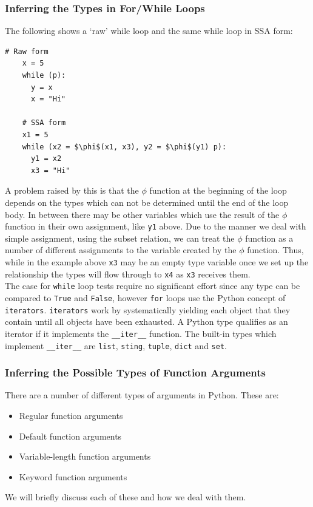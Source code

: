 \documentclass[12pt, titlepage]{article}
\begin{document}
\subsubsection{Inferring the Types in For/While Loops}
The following shows a `raw' while loop and the same while loop in SSA form:
\begin{lstlisting}[mathescape]
    # Raw form
    x = 5
    while (p):
      y = x
      x = "Hi"
	
    # SSA form
    x1 = 5
    while (x2 = $\phi$(x1, x3), y2 = $\phi$(y1) p):
      y1 = x2
      x3 = "Hi"
\end{lstlisting}
A problem raised by this is that the $\phi$ function at the beginning of the loop depends on the types which can not be determined until the end of the loop body. In between there may be other variables which use the result of the $\phi$ function in their own assignment, like \texttt{y1} above. Due to the manner we deal with simple assignment, using the subset relation, we can treat the $\phi$ function as a number of different assignments to the variable created by the $\phi$ function. Thus, while in the example above \texttt{x3} may be an empty type variable once we set up the relationship the types will flow through to \texttt{x4} as \texttt{x3} receives them. \\
\indent The case for \texttt{while} loop tests require no significant effort since any type can be compared to \texttt{True} and \texttt{False}, however \texttt{for} loops use the Python concept of \texttt{iterators}. \texttt{iterators} work by systematically yielding each object that they contain until all objects have been exhausted.
A Python type qualifies as an iterator if it implements the \texttt{\_\_iter\_\_} function. The built-in types which implement \texttt{\_\_iter\_\_} are \texttt{list}, \texttt{sting}, \texttt{tuple}, \texttt{dict} and \texttt{set}.


\subsubsection{Inferring the Possible Types of Function Arguments}
\label{chap:inferringFuncArgs}
There are a number of different types of arguments in Python. These are:
\begin{itemize}
	\item Regular function arguments
	\item Default function arguments
	\item Variable-length function arguments
	\item Keyword function arguments
\end{itemize}
We will briefly discuss each of these and how we deal with them.
\end{document}
